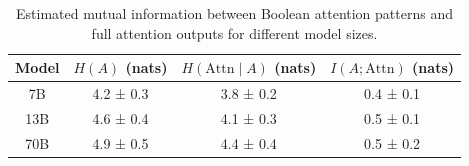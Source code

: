 \begin{table}[ht!]






\centering






\begin{tabular}{|c|c|c|c|}






\hline






Model & $H(A)$ (nats) & $H(\text{Attn} \mid A)$ (nats) & $I(A; \text{Attn})$ (nats) \\






\hline






7B & 4.2 ± 0.3 & 3.8 ± 0.2 & 0.4 ± 0.1 \\






\hline






13B & 4.6 ± 0.4 & 4.1 ± 0.3 & 0.5 ± 0.1 \\






\hline






70B & 4.9 ± 0.5 & 4.4 ± 0.4 & 0.5 ± 0.2 \\






\hline






\end{tabular}






\caption{Estimated mutual information between Boolean attention patterns and full attention outputs for different model sizes.}






\label{table:mutual-info}






\end{table}













